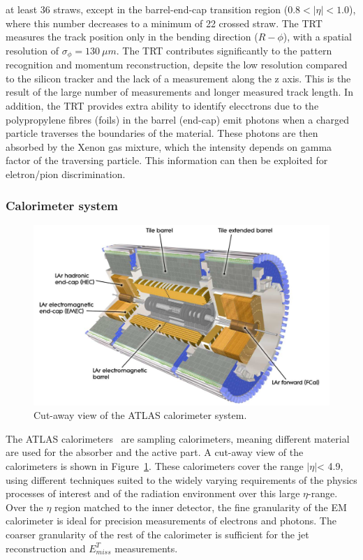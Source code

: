 \documentclass[letterpaper,12pt]{article}
\begin{document}
\begin{itemize}
	at least 36 straws, except in the
	barrel-end-cap transition region ($0.8 < |\eta|< 1.0$), 
	where this number decreases to a minimum of 22 crossed straw.
	The TRT measures the track position only in the bending direction
	($R-\phi$), with a spatial resolution of $\sigma_\phi = 130\ \mu m$.
	The TRT contributes significantly to the pattern recognition and 
	momentum reconstruction, depsite the low resolution compared to the 
	silicon tracker and the lack of a measurement along the z axis. 
	This is the result of the large number of measurements and longer
	measured track length. In addition, the TRT provides extra ability to 
	identify elecctrons due to the polypropylene fibres (foils) in the barrel
	(end-cap) emit photons when a charged particle traverses the boundaries of
	the material. These photons are then absorbed by the Xenon gas mixture, which
	the intensity depends on gamma factor of the traversing particle. 
	This information can then be exploited for eletron/pion discrimination.
	\end{itemize}

	\subsubsection{Calorimeter system}



	\begin{figure}[bht]
		\begin{centering}	
		\includegraphics[width=.6\textwidth]{Detector_plots/calo.png}
		\caption{Cut-away view of the ATLAS calorimeter system.}
		\label{fig:calo}
		\end{centering}
	\end{figure}

	The ATLAS calorimeters~\cite{ATLAS-TDR-01}
	are sampling calorimeters, meaning
	different material are used for the absorber and the active part.
	A cut-away view of the calorimeters is shown in Figure~\ref{fig:calo}.
	These calorimeters cover the range $|\eta|$< 4.9, using 
	different techniques suited to the widely varying requirements 
	of the physics processes of interest and of the radiation environment
	over this large $\eta$-range. Over the $\eta$ region matched to 
	the inner detector, the fine granularity of	the EM calorimeter 
	is ideal for precision measurements of electrons and photons. The
	coarser granularity of the rest of the calorimeter is sufficient 
	for the jet reconstruction and $E_{miss}^T$ measurements.
\end{document}

